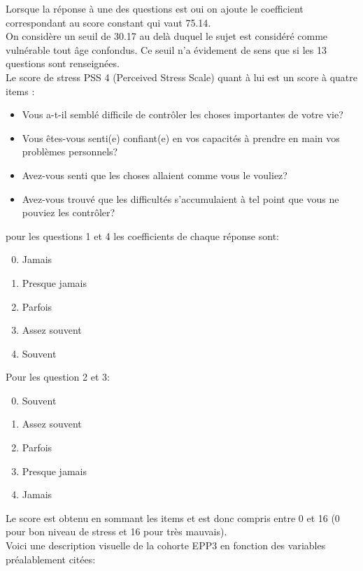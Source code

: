 \documentclass{book}
\begin{document}
\noindent
Lorsque la réponse à une des questions est oui on ajoute le coefficient correspondant au score constant qui vaut 75.14.\\
On considère un seuil de 30.17 au delà duquel le sujet est considéré comme vulnérable tout âge confondus. Ce seuil n'a évidement de sens que si les 13 questions sont renseignées.\\

\bigskip
\noindent
Le score de stress PSS 4 (Perceived Stress Scale) quant à lui est un score à quatre items :\begin{itemize}
\item Vous a-t-il semblé difficile de contrôler les choses importantes de votre vie? 
\item Vous êtes-vous senti(e) confiant(e) en vos capacités à prendre en main vos problèmes personnels?
\item Avez-vous senti que les choses allaient comme vous le vouliez?
\item Avez-vous trouvé que les difficultés s'accumulaient à tel point que vous ne pouviez les contrôler? 
\end{itemize}

pour les questions 1 et 4 les coefficients de chaque réponse sont:
\begin{enumerate}
\setcounter{enumi}{-1}
\item Jamais
\item Presque jamais
\item Parfois
\item Assez souvent
\item Souvent
\end{enumerate}

Pour les question 2 et 3:
\begin{enumerate}
\setcounter{enumi}{-1}
\item Souvent
\item Assez souvent
\item Parfois
\item Presque jamais
\item Jamais
\end{enumerate}

Le score est obtenu en sommant les items et est donc compris entre 0 et 16 (0 pour bon niveau de stress et 16 pour très mauvais).\\

\noindent
Voici une description visuelle de la cohorte EPP3 en fonction des variables préalablement citées:\\
\end{document}
